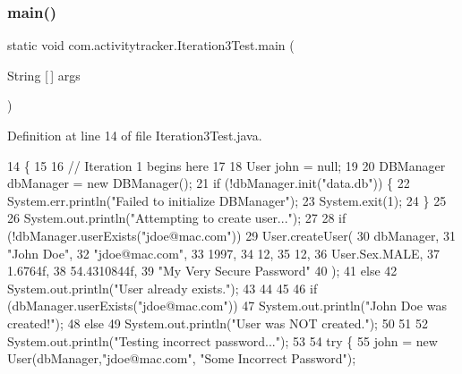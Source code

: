\subsubsection{\texorpdfstring{main()}{main()}}
{\footnotesize\ttfamily static void com.\+activitytracker.\+Iteration3\+Test.\+main (\begin{DoxyParamCaption}\item[{String \mbox{[}$\,$\mbox{]}}]{args }\end{DoxyParamCaption})\hspace{0.3cm}{\ttfamily [static]}}



Definition at line 14 of file Iteration3\+Test.\+java.


\begin{DoxyCode}
14                                            \{
15 
16         \textcolor{comment}{// Iteration 1 begins here}
17 
18         User john = null;
19 
20         DBManager dbManager = \textcolor{keyword}{new} DBManager();
21         \textcolor{keywordflow}{if} (!dbManager.init(\textcolor{stringliteral}{"data.db"})) \{
22             System.err.println(\textcolor{stringliteral}{"Failed to initialize DBManager"});
23             System.exit(1);
24         \}
25 
26         System.out.println(\textcolor{stringliteral}{"Attempting to create user..."});
27 
28         \textcolor{keywordflow}{if} (!dbManager.userExists(\textcolor{stringliteral}{"jdoe@mac.com"}))
29             User.createUser(
30                     dbManager,
31                     \textcolor{stringliteral}{"John Doe"},
32                     \textcolor{stringliteral}{"jdoe@mac.com"},
33                     1997,
34                     12,
35                     12,
36                     User.Sex.MALE,
37                     1.6764f,
38                     54.4310844f,
39                     \textcolor{stringliteral}{"My Very Secure Password"}
40             );
41         \textcolor{keywordflow}{else}
42             System.out.println(\textcolor{stringliteral}{"User already exists."});
43 
44 
45 
46         \textcolor{keywordflow}{if} (dbManager.userExists(\textcolor{stringliteral}{"jdoe@mac.com"}))
47             System.out.println(\textcolor{stringliteral}{"John Doe was created!"});
48         \textcolor{keywordflow}{else}
49             System.out.println(\textcolor{stringliteral}{"User was NOT created."});
50 
51 
52         System.out.println(\textcolor{stringliteral}{"Testing incorrect password..."});
53 
54         \textcolor{keywordflow}{try} \{
55             john = \textcolor{keyword}{new} User(dbManager,\textcolor{stringliteral}{"jdoe@mac.com"}, \textcolor{stringliteral}{"Some Incorrect Password"});

\end{DoxyCode}
